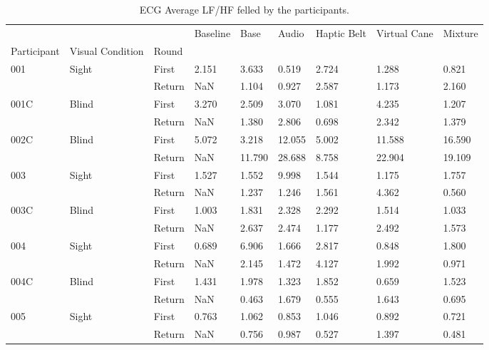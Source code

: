 
\begin{table}[!htb]
\centering
\caption{ECG Average LF/HF felled by the participants.}
\label{tab:ecg_lfhf_table}
\begin{tabular}{lllllllll}
\toprule
    &       &        &  Baseline &   Base &  Audio &  Haptic Belt &  Virtual Cane &  Mixture \\
Participant & Visual Condition & Round &           &        &        &              &               &          \\
\midrule
001 & Sight & First &     2.151 &  3.633 &  0.519 &        2.724 &         1.288 &    0.821 \\
    &       & Return &       NaN &  1.104 &  0.927 &        2.587 &         1.173 &    2.160 \\
001C & Blind & First &     3.270 &  2.509 &  3.070 &        1.081 &         4.235 &    1.207 \\
    &       & Return &       NaN &  1.380 &  2.806 &        0.698 &         2.342 &    1.379 \\
002C & Blind & First &     5.072 &  3.218 & 12.055 &        5.002 &        11.588 &   16.590 \\
    &       & Return &       NaN & 11.790 & 28.688 &        8.758 &        22.904 &   19.109 \\
003 & Sight & First &     1.527 &  1.552 &  9.998 &        1.544 &         1.175 &    1.757 \\
    &       & Return &       NaN &  1.237 &  1.246 &        1.561 &         4.362 &    0.560 \\
003C & Blind & First &     1.003 &  1.831 &  2.328 &        2.292 &         1.514 &    1.033 \\
    &       & Return &       NaN &  2.637 &  2.474 &        1.177 &         2.492 &    1.573 \\
004 & Sight & First &     0.689 &  6.906 &  1.666 &        2.817 &         0.848 &    1.800 \\
    &       & Return &       NaN &  2.145 &  1.472 &        4.127 &         1.992 &    0.971 \\
004C & Blind & First &     1.431 &  1.978 &  1.323 &        1.852 &         0.659 &    1.523 \\
    &       & Return &       NaN &  0.463 &  1.679 &        0.555 &         1.643 &    0.695 \\
005 & Sight & First &     0.763 &  1.062 &  0.853 &        1.046 &         0.892 &    0.721 \\
    &       & Return &       NaN &  0.756 &  0.987 &        0.527 &         1.397 &    0.481 \\
\bottomrule
\end{tabular}
\end{table}

